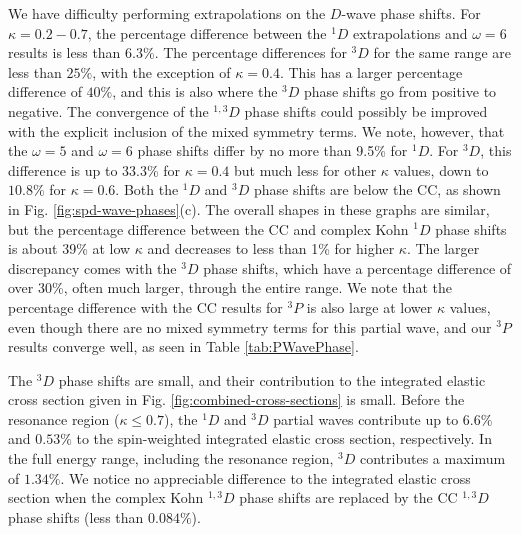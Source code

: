 \documentclass[preprint,showpacs,showkeys,preprintnumbers,amsmath,amssymb,longbibliography,pra,aps]{revtex4-1}
\begin{document}
We have difficulty performing extrapolations on the $D$-wave phase shifts. 
For $\kappa = 0.2 - 0.7$, the percentage difference between the $^1D$ 
extrapolations and $\omega = 6$ results is less than $6.3\%$. The percentage 
differences for $^3D$ for the same range are less than $25\%$, with the 
exception of $\kappa = 0.4$. This has a larger percentage difference of
$40\%$, and this is also where the $^3D$ phase shifts go from positive to 
negative. The convergence of the $^{1,3}D$ phase shifts could possibly be
improved with the explicit inclusion of the mixed symmetry terms. We note,
however, that the
$\omega = 5$ and $\omega = 6$ phase shifts differ by no more than 9.5\% for
$^1D$. For $^3D$, this difference is up to 33.3\% for $\kappa=0.4$
but much less for other $\kappa$ values, down to $10.8\%$ for $\kappa = 0.6$.
Both the $^1D$ and $^3D$ phase shifts are below the 
CC, as shown in Fig. \ref{fig:spd-wave-phases}(c). The overall shapes in these
graphs are similar, but the percentage difference between the CC and
complex Kohn $^1D$ phase
shifts is about 39\% at low $\kappa$ and decreases to less than 1\% for
higher $\kappa$. The larger discrepancy comes with the $^3D$ phase shifts,
which have a percentage difference of over 30\%, often much larger,
through the entire range.
We note that the percentage difference with the CC results for $^3P$ is
also large at lower $\kappa$ values, even though there are no mixed symmetry
terms for this partial wave, and our $^3P$ results converge well, as seen in
Table \ref{tab:PWavePhase}. 

The $^3D$ phase shifts are small, and their contribution to the integrated 
elastic cross section given in Fig. \ref{fig:combined-cross-sections} is 
small. Before the resonance region ($\kappa \leq 0.7$), the $^1D$ and $^3D$ 
partial waves contribute up to $6.6\%$ and $0.53\%$ to the spin-weighted 
integrated elastic cross section, respectively. In the full energy range, 
including the resonance region, $^3D$ contributes a maximum of $1.34\%$. 
We notice no appreciable difference to the integrated elastic cross
section when the complex Kohn $^{1,3}D$ phase shifts are replaced by the CC
$^{1,3}D$ phase shifts (less than $0.084\%$).
\end{document}
